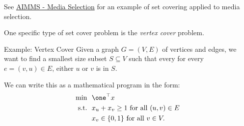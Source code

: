 \begin{resource}
See \href{https://download.aimms.com/aimms/download/manuals/AIMMS3OM_MediaSelection.pdf}{AIMMS - Media Selection} for an example of set covering applied to media selection.
\end{resource}


One specific type of set cover problem is the \emph{vertex cover} problem.
\begin{general}{Example: Vertex Cover}{\npcomplete}
Given a graph $G = (V,E)$ of vertices and edges, we want to find a smallest size subset $S \subseteq V$ such that every for every $e = (v,u) \in E$, either $u$ or $v$ is in $S$.   

We can write this as a mathematical program in the form:
\begin{equation}
\begin{split}
\min \ \ & \one^\top x\\
\text{s.t.} \ \ & x_u + x_v \geq 1 \text{ for all } (u,v) \in E \\ 
& x_v \in \{0,1\} \text{ for all } v \in V.
\end{split}
\end{equation}
\end{general}




